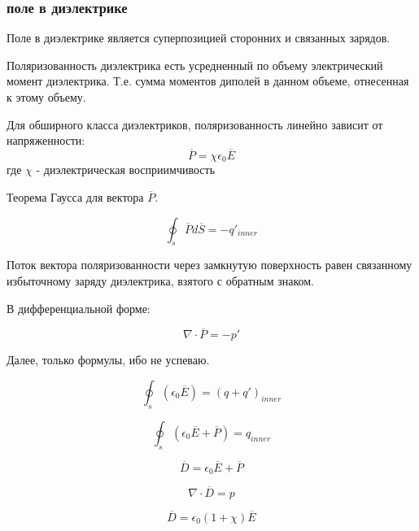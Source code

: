 \subsubsection{поле в диэлектрике}

Поле в диэлектрике является суперпозицией сторонних и связанных зарядов.

Поляризованность диэлектрика есть усредненный по объему электрический момент диэлектрика. Т.е. сумма моментов диполей в данном объеме, отнесенная к этому объему.

Для обширного класса диэлектриков, поляризованность линейно зависит от напряженности:
\begin{equation}
\overline{P} = \chi \epsilon_0 \overline{E}
\end{equation}
где $\chi$ - диэлектрическая восприимчивость

Теорема Гаусса для вектора $\overline{P}$.

\begin{equation}
\oint_s \overline{P} d \overline{S} = -q'_{inner}
\end{equation}

Поток вектора поляризованности через замкнутую поверхность равен связанному избыточному заряду диэлектрика, взятого с обратным знаком.

В дифференциальной форме:

\begin{equation}
\nabla \cdot \overline{P} = -p'
\end{equation}




Далее, только формулы, ибо не успеваю.


\begin{equation}
\oint_s (\epsilon_0 \overline{E}) = (q + q')_{inner}
\end{equation}


\begin{equation}
\oint_s (\epsilon_0 \overline{E} + \overline{P}) = q_{inner}
\end{equation}


\begin{equation}
\overline{D} = \epsilon_0 \overline{E} + \overline{P}
\end{equation}


\begin{equation}
\nabla \cdot \overline{D} = p
\end{equation}


\begin{equation}
\overline{D} = \epsilon_0 (1+\chi) \overline{E}
\end{equation}

